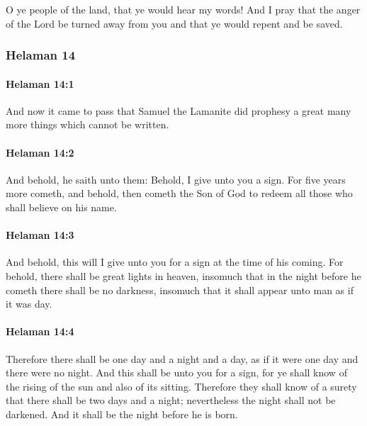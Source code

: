 			O ye people of the land,
			that ye would hear my words!
			And I pray that the anger of the Lord be turned away from you
			and that ye would repent and be saved.

	\subsubsection{Helaman 14} %
		\label{HELAMAN-14}
		
		\paragraph{Helaman 14:1} %
			\label{HELAMAN-14-1}

			And now it came to pass that
			Samuel the Lamanite did prophesy a great many more things
			which cannot be written.
		\paragraph{Helaman 14:2} %
			\label{HELAMAN-14-2}

			And behold, he saith unto them:
			Behold, I give unto you a sign.
			For five years more cometh,
			and behold, then cometh the Son of God
			to redeem all those who shall believe on his name.

		\paragraph{Helaman 14:3} %
			\label{HELAMAN-14-3}

			And behold, this will I give unto you for a sign at the time of his coming.
			For behold, there shall be great lights in heaven,
			insomuch that in the night before he cometh
			there shall be no darkness,
			insomuch that it shall appear unto man as if it was day.

		\paragraph{Helaman 14:4} %
			\label{HELAMAN-14-4}

			Therefore there shall be one day and a night and a day,
			as if it were one day and there were no night.
			And this shall be unto you for a sign,
			for ye shall know of the rising of the sun and also of its sitting.
			Therefore they shall know of a surety that there shall be two days and a night;
			nevertheless the night shall not be darkened.
			And it shall be the night before he is born.

